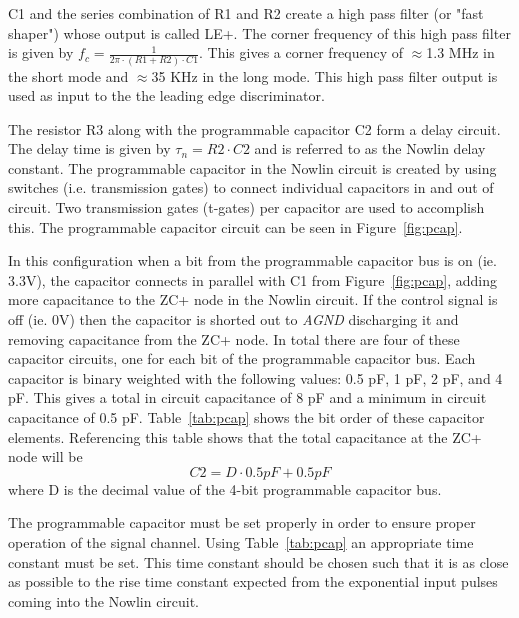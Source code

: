 \documentclass[12pt,oneside,final]{siuethesis}
\theoremstyle{definition}
\begin{document}
\par C1 and the series combination of R1 and R2 create a high pass filter (or "fast shaper") whose output is called LE+. The corner frequency of this high pass filter is given by $f_{c} = \frac{1}{2\pi \cdot(R1 + R2)\cdot C1}$. This gives a corner frequency of $\approx$1.3 MHz in the short mode and $\approx$35 KHz in the long mode. This high pass filter output is used as input to the the leading edge discriminator. 
\par The resistor R3 along with the programmable capacitor C2 form a delay circuit. The delay time is given by $\tau_{n} = R2 \cdot C2$ and is referred to as the Nowlin delay constant. The programmable capacitor in the Nowlin circuit is created by using switches (i.e. transmission gates) to connect individual capacitors in and out of circuit. Two transmission gates (t-gates) per capacitor are used to accomplish this. The programmable capacitor circuit can be seen in Figure~\ref{fig:pcap}.
\par In this configuration when a bit from the programmable capacitor bus is on (ie. 3.3V), the capacitor connects in parallel with C1 from Figure~\ref{fig:pcap}, adding more capacitance to the ZC+ node in the Nowlin circuit. If the control signal is off (ie. 0V) then the capacitor is shorted out to \emph{AGND} discharging it and removing capacitance from the ZC+ node. In total there are four of these capacitor circuits, one for each bit of the programmable capacitor bus. Each capacitor is binary weighted with the following values: 0.5 pF, 1 pF, 2 pF, and 4 pF. This gives a total in circuit capacitance of 8 pF and a minimum in circuit capacitance of 0.5 pF. Table~\ref{tab:pcap} shows the bit order of these capacitor elements. Referencing this table shows that the total capacitance at the ZC+ node will be \begin{equation}
C2 = D \cdot 0.5 pF + 0.5 pF
\end{equation} 
where D is the decimal value of the 4-bit programmable capacitor bus.
\par The programmable capacitor must be set properly in order to ensure proper operation of the signal channel. Using Table~\ref{tab:pcap} an appropriate time constant must be set. This time constant should be chosen such that it is as close as possible to the rise time constant expected from the exponential input pulses coming into the Nowlin circuit.
\end{document}
